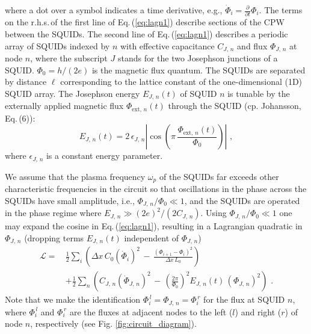 %
where a dot over a symbol indicates a time derivative, e.g., 
$\displaystyle \dot{\Phi}_i = \frac{\partial}{\partial t} \Phi_i$.
The terms on the r.h.s.\,of the first line of Eq.\,(\ref{eq:lagn1}) describe sections of the CPW between the SQUIDs. 
The second line of Eq.\,(\ref{eq:lagn1}) describes a periodic array of SQUIDs indexed by $n$ 
with effective capacitance $C_{J,\,n}$ and flux $\Phi_{J,\,n}$ at node $n$, where 
the subscript $J$ stands for the two Josephson junctions of a SQUID.
$\Phi_0 = h / (2 e)$ is the magnetic flux quantum.
The SQUIDs are separated by 
distance $\ell$ corresponding to the lattice constant of the one-dimensional (1D) SQUID array. 
The Josephson energy $E_{J,\,n}(t)$ of SQUID $n$ is tunable
by the externally applied magnetic flux $\Phi_{\text{ext},\,n}(t)$ through the SQUID 
(cp. Johansson, Eq.\,(6)): 
%
\begin{equation} \label{eq:squidenergy}
    E_{J,\,n}(t) = 2 \, \epsilon_{J,\,n} 
    \left\vert \cos\left(\pi \, \frac{\Phi_{\text{ext},\,n}(t)}{\Phi_0}\right)\right\vert \, \, ,
\end{equation}
%
where $\epsilon_{J,\,n}$ is a constant energy parameter.

We assume that the plasma frequency $\omega_p$ of the SQUIDs far exceeds other characteristic frequencies 
in the circuit so that oscillations in the phase across the SQUIDs have small amplitude, i.e., 
$\Phi_{J,\,n} / \Phi_0 \ll 1$,
and the SQUIDs are operated in the phase regime where $E_{J,\,n} \gg (2e)^2 / (2C_{J,\,n})$. 
Using $\Phi_{J,\,n} / \Phi_0 \ll 1$ one may expand the cosine in Eq.\,(\ref{eq:lagn1}), 
resulting in a Lagrangian quadratic in $\Phi_{J,\,n}$ (dropping terms $E_{J,\,n}(t)$ 
independent of $\Phi_{J,\,n}$)
%
\begin{equation} \label{eq:lagn2}
\begin{split}
\mathcal{L} = \, & \frac{1}{2} \sum_i \left( \Delta x \, C_{0} \left(\dot{\Phi}_{i}\right)^{2} \, - \, 
\frac{\left(\Phi_{i+1}-\Phi_{i}\right)^{2}}{\Delta x \, L_{0}} \right)  \\[2mm]
& + \frac{1}{2} \sum_n \left( C_{J,\,n} \left(\dot{\Phi}_{J,\,n} \right)^{2} \, - \, 
 \left(\frac{2 \pi}{\Phi_0} \right)^2 E_{J,\,n}(t) \, \left( \Phi_{J,\,n} \right)^2 
\right) \, \, .
\end{split}
\end{equation}
%
Note that we make the identification $\Phi_i^{\,l} = \Phi_{J,\,n} = \Phi_i^{\,r}$ for the flux at SQUID $n$, 
where $\Phi_i^{\,l}$ and $\Phi_i^{\,r}$ are the fluxes at adjacent nodes to the left ($l$) and right ($r$) of 
node $n$, respectively (see Fig. \ref{fig:circuit_diagram}). 

